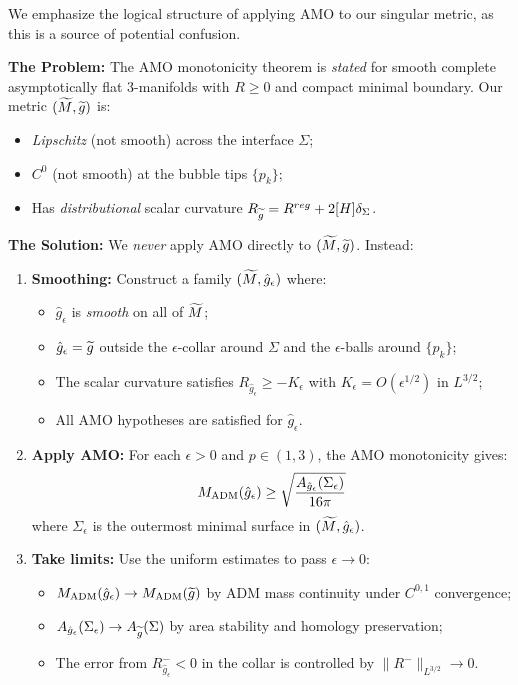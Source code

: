 \begin{remark}\label{rem:AMOApproximation}
We emphasize the logical structure of applying AMO to our singular metric, as this is a source of potential confusion.

\textbf{The Problem:} The AMO monotonicity theorem \cite{amo2024} is \emph{stated} for smooth complete asymptotically flat 3-manifolds with $R \ge 0$ and compact minimal boundary. Our metric $(\widetilde{M}, \widetilde{g})$ is:
\begin{itemize}
    \item \emph{Lipschitz} (not smooth) across the interface $\Sigma$;
    \item \emph{$C^0$} (not smooth) at the bubble tips $\{p_k\}$;
    \item Has \emph{distributional} scalar curvature $R_{\widetilde{g}} = R^{reg} + 2[H]\delta_\Sigma$.
\end{itemize}

\textbf{The Solution:} We \emph{never} apply AMO directly to $(\widetilde{M}, \widetilde{g})$. Instead:
\begin{enumerate}
    \item[(i)] \textbf{Smoothing:} Construct a family $(\widetilde{M}, \hat{g}_\epsilon)$ where:
    \begin{itemize}
        \item $\hat{g}_\epsilon$ is \emph{smooth} on all of $\widetilde{M}$;
        \item $\hat{g}_\epsilon = \widetilde{g}$ outside the $\epsilon$-collar around $\Sigma$ and the $\epsilon$-balls around $\{p_k\}$;
        \item The scalar curvature satisfies $R_{\hat{g}_\epsilon} \ge -K_\epsilon$ with $K_\epsilon = O(\epsilon^{1/2})$ in $L^{3/2}$;
        \item All AMO hypotheses are satisfied for $\hat{g}_\epsilon$.
    \end{itemize}
    
    \item[(ii)] \textbf{Apply AMO:} For each $\epsilon > 0$ and $p \in (1,3)$, the AMO monotonicity gives:
    \[
        M_{\mathrm{ADM}}(\hat{g}_\epsilon) \ge \sqrt{\frac{A_{\hat{g}_\epsilon}(\Sigma_\epsilon)}{16\pi}}
    \]
    where $\Sigma_\epsilon$ is the outermost minimal surface in $(\widetilde{M}, \hat{g}_\epsilon)$.
    
    \item[(iii)] \textbf{Take limits:} Use the uniform estimates to pass $\epsilon \to 0$:
    \begin{itemize}
        \item $M_{\mathrm{ADM}}(\hat{g}_\epsilon) \to M_{\mathrm{ADM}}(\widetilde{g})$ by ADM mass continuity under $C^{0,1}$ convergence;
        \item $A_{\hat{g}_\epsilon}(\Sigma_\epsilon) \to A_{\widetilde{g}}(\Sigma)$ by area stability and homology preservation;
        \item The error from $R_{\hat{g}_\epsilon}^- < 0$ in the collar is controlled by $\|R^-\|_{L^{3/2}} \to 0$.
    \end{itemize}
\end{enumerate}


\end{remark}
